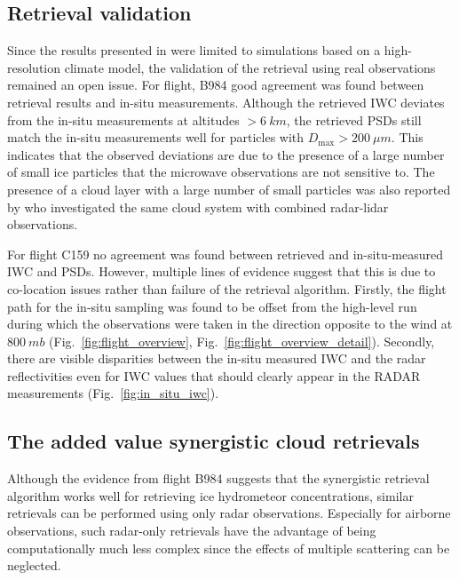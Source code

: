 \documentclass[journal abbreviation, manuscript]{copernicus}
\begin{document}
\subsection{Retrieval validation}

Since the results presented in \citet{pfreundschuh19} were limited to
simulations based on a high-resolution climate model, the validation of the
retrieval using real observations remained an open issue. For flight, B984 good
agreement was found between retrieval results and in-situ measurements. Although
the retrieved IWC deviates from the in-situ measurements at altitudes $>
6\ \unit{km}$, the retrieved PSDs still match the in-situ measurements well for
particles with $D_\text{max} > 200\ \unit{\mu m}$. This indicates that the
observed deviations are due to the presence of a large number of small ice
particles that the microwave observations are not sensitive to. The presence of
a cloud layer with a large number of small particles was also reported by
\citet{ewald21} who investigated the same cloud system with combined radar-lidar
observations.

For flight C159 no agreement was found between retrieved and in-situ-measured
IWC and PSDs. However, multiple lines of evidence suggest that this is due to
co-location issues rather than failure of the retrieval algorithm. Firstly, the
flight path for the in-situ sampling was found to be offset from the high-level
run during which the observations were taken in the direction opposite to the
wind at $800\ \unit{mb}$ (Fig.~\ref{fig:flight_overview},
Fig.~\ref{fig:flight_overview_detail}). Secondly, there are visible disparities
between the in-situ measured IWC and the radar reflectivities even for IWC
values that should clearly appear in the RADAR measurements
(Fig.~\ref{fig:in_situ_iwc}).

\subsection{The added value synergistic cloud retrievals}

Although the evidence from flight B984 suggests that the synergistic
retrieval algorithm works well for retrieving ice hydrometeor concentrations,
similar retrievals can be performed using only radar observations. Especially
for airborne observations, such radar-only retrievals have the advantage of
being computationally much less complex since the effects of multiple
scattering can be neglected.
\end{document}
